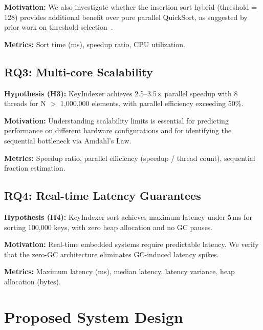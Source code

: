 \documentclass[conference]{IEEEtran}
\begin{document}
\textbf{Motivation:} We also investigate whether the insertion sort hybrid (threshold = 128) provides additional benefit over pure parallel QuickSort, as suggested by prior work on threshold selection~\cite{aumuller2013randomized}.

\textbf{Metrics:} Sort time (ms), speedup ratio, CPU utilization.

\subsection{RQ3: Multi-core Scalability}
\label{sec:rq3}

\textbf{Hypothesis (H3):} KeyIndexer achieves 2.5--3.5$\times$ parallel speedup with 8 threads for N $>$ 1,000,000 elements, with parallel efficiency exceeding 50\%.

\textbf{Motivation:} Understanding scalability limits is essential for predicting performance on different hardware configurations and for identifying the sequential bottleneck via Amdahl's Law.

\textbf{Metrics:} Speedup ratio, parallel efficiency (speedup / thread count), sequential fraction estimation.

\subsection{RQ4: Real-time Latency Guarantees}
\label{sec:rq4}

\textbf{Hypothesis (H4):} KeyIndexer sort achieves maximum latency under 5\,ms for sorting 100,000 keys, with zero heap allocation and no GC pauses.

\textbf{Motivation:} Real-time embedded systems require predictable latency. We verify that the zero-GC architecture eliminates GC-induced latency spikes.

\textbf{Metrics:} Maximum latency (ms), median latency, latency variance, heap allocation (bytes).

\section{Proposed System Design}
\label{sec:design}
\end{document}
